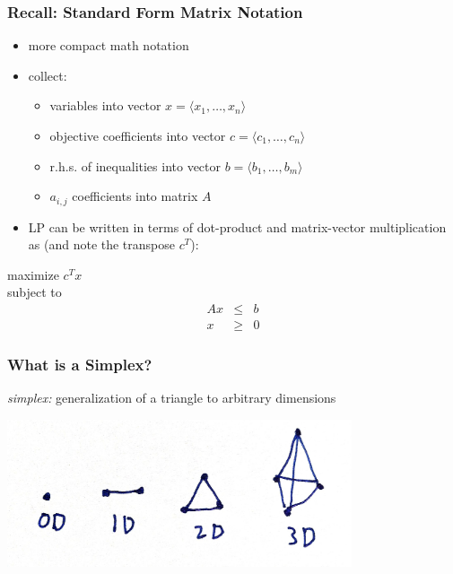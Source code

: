 \documentclass[10pt,aspectratio=169]{beamer}
\begin{document}
\begin{frame} \frametitle{Recall: Standard Form Matrix Notation}
\begin{itemize}
  \item more compact math notation
  \item collect:
  \begin{itemize}
    \item variables into vector $x=\langle x_1, \ldots, x_n \rangle$
    \item objective coefficients into vector $c=\langle c_1, \ldots, c_n\rangle$
    \item r.h.s. of inequalities into vector $b=\langle b_1, \ldots, b_m\rangle$
    \item $a_{i,j}$ coefficients into matrix $A$
  \end{itemize}
  \item LP can be written in terms of dot-product and matrix-vector multiplication
    as (and note the transpose $c^T$):
\end{itemize}
\vspace{.5cm}
maximize $c^T x$ \\
subject to
\begin{eqnarray*}
  Ax &\leq& b \\
  x &\geq& 0
\end{eqnarray*}
\end{frame}

\begin{frame} \frametitle{What is a Simplex?}
  \emph{simplex:} generalization of a triangle to arbitrary dimensions

  \begin{center}
  \includegraphics[width=4in]{simplices.jpg}
\end{center}
\end{frame}
\end{document}
